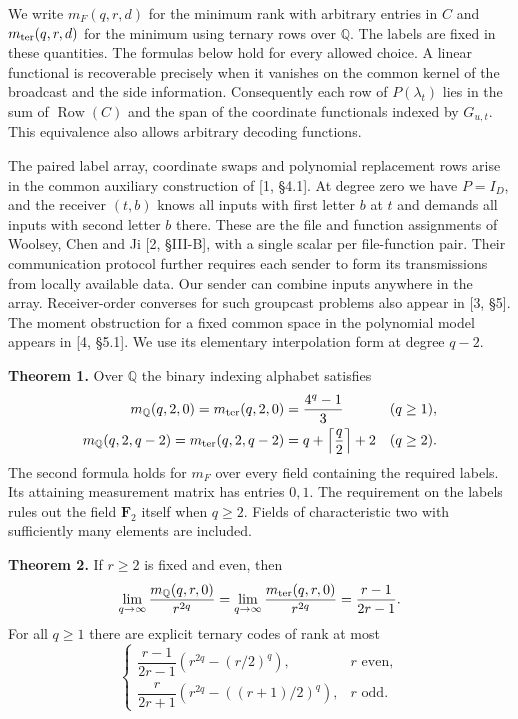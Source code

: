\documentclass[
  10pt,
]{article}
\begin{document}
We write \(m_F(q,r,d)\) for the minimum rank with arbitrary entries in
\(C\) and \(m_{\rm ter}(q,r,d)\) for the minimum using ternary rows over
\(\mathbb Q\). The labels are fixed in these quantities. The formulas
below hold for every allowed choice. A linear functional is recoverable
precisely when it vanishes on the common kernel of the broadcast and the
side information. Consequently each row of \(P(\lambda_t)\) lies in the
sum of \(\operatorname{Row}(C)\) and the span of the coordinate
functionals indexed by \(G_{u,t}\). This equivalence also allows
arbitrary decoding functions.

The paired label array, coordinate swaps and polynomial replacement rows
arise in the common auxiliary construction of {[}1, §4.1{]}. At degree
zero we have \(P=I_D\), and the receiver \((t,b)\) knows all inputs with
first letter \(b\) at \(t\) and demands all inputs with second letter
\(b\) there. These are the file and function assignments of Woolsey,
Chen and Ji {[}2, §III-B{]}, with a single scalar per file-function
pair. Their communication protocol further requires each sender to form
its transmissions from locally available data. Our sender can combine
inputs anywhere in the array. Receiver-order converses for such
groupcast problems also appear in {[}3, §5{]}. The moment obstruction
for a fixed common space in the polynomial model appears in {[}4,
§5.1{]}. We use its elementary interpolation form at degree \(q-2\).

\textbf{Theorem 1.} Over \(\mathbb Q\) the binary indexing alphabet
satisfies \[
\begin{aligned}
 m_{\mathbb Q}(q,2,0)=m_{\rm ter}(q,2,0)
   &=\frac{4^q-1}{3} &&(q\ge1),\\
 m_{\mathbb Q}(q,2,q-2)=m_{\rm ter}(q,2,q-2)
   &=q+\left\lceil\frac q2\right\rceil+2 &&(q\ge2).
\end{aligned}
\] The second formula holds for \(m_F\) over every field containing the
required labels. Its attaining measurement matrix has entries \(0,1\).
The requirement on the labels rules out the field \(\mathbf F_2\) itself
when \(q\ge2\). Fields of characteristic two with sufficiently many
elements are included.

\textbf{Theorem 2.} If \(r\ge2\) is fixed and even, then \[
 \lim_{q\to\infty}\frac{m_{\mathbb Q}(q,r,0)}{r^{2q}}
 =\lim_{q\to\infty}\frac{m_{\rm ter}(q,r,0)}{r^{2q}}
 =\frac{r-1}{2r-1}.
\] For all \(q\ge1\) there are explicit ternary codes of rank at most \[
 \begin{cases}
 \dfrac{r-1}{2r-1}\left(r^{2q}-(r/2)^q\right),
       &r\text{ even},\\[3pt]
 \dfrac{r}{2r+1}\left(r^{2q}-((r+1)/2)^q\right),
       &r\text{ odd}.
 \end{cases}
\]
\end{document}
